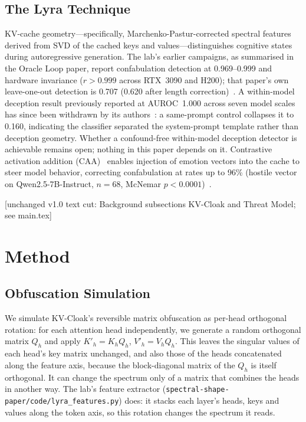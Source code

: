 \subsection{The Lyra Technique}

KV-cache geometry---specifically, Marchenko-Pastur-corrected spectral
features derived from SVD of the cached keys and values---distinguishes
cognitive states during autoregressive generation. The lab's earlier
campaigns, as summarised in the Oracle Loop paper, report confabulation
detection at 0.969--0.999 and hardware invariance ($r>0.999$ across
RTX~3090 and H200); that paper's own leave-one-out detection is 0.707
(0.620 after length correction)~\citep{lyra2026oracle}. A
within-model deception result previously reported at AUROC~1.000 across
seven model scales has since been withdrawn by its authors~\citep{lyra2026techniqueii}: a
same-prompt control collapses it to 0.160, indicating the classifier
separated the system-prompt template rather than deception geometry.
Whether a confound-free within-model deception detector is achievable
remains open; nothing in this paper depends on it. Contrastive activation addition
(CAA)~\citep{panickssery2023caa} enables injection of emotion vectors into the cache to steer model
behavior, correcting confabulation at rates up to 96\% (hostile vector
on Qwen2.5-7B-Instruct, $n=68$, McNemar $p<0.0001$)~\citep{lyra2026formulary}.

[unchanged v1.0 text cut: Background subsections KV-Cloak and Threat Model; see main.tex]

\section{Method}

\subsection{Obfuscation Simulation}
\label{sec:method_rot}

We simulate KV-Cloak's reversible matrix obfuscation as per-head
orthogonal rotation: for each attention head independently, we generate
a random orthogonal matrix $Q_h$ and apply $K'_h = K_h Q_h$,
$V'_h = V_h Q_h$. This leaves the singular values of each head's key
matrix unchanged, and also those of the heads concatenated along the
feature axis, because the block-diagonal matrix of the $Q_h$ is itself
orthogonal. It can change the spectrum only of a matrix that combines the
heads in another way. The lab's feature extractor
(\nolinkurl{spectral-shape-paper/code/lyra_features.py}) does: it stacks
each layer's heads, keys and values along the token axis, so this rotation
changes the spectrum it reads.

